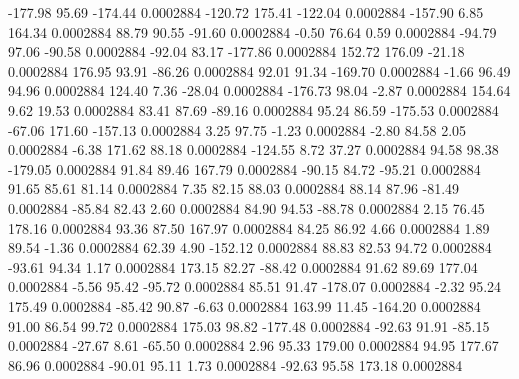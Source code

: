      -177.98       95.69     -174.44     0.0002884
     -120.72      175.41     -122.04     0.0002884
     -157.90        6.85      164.34     0.0002884
       88.79       90.55      -91.60     0.0002884
       -0.50       76.64        0.59     0.0002884
      -94.79       97.06      -90.58     0.0002884
      -92.04       83.17     -177.86     0.0002884
      152.72      176.09      -21.18     0.0002884
      176.95       93.91      -86.26     0.0002884
       92.01       91.34     -169.70     0.0002884
       -1.66       96.49       94.96     0.0002884
      124.40        7.36      -28.04     0.0002884
     -176.73       98.04       -2.87     0.0002884
      154.64        9.62       19.53     0.0002884
       83.41       87.69      -89.16     0.0002884
       95.24       86.59     -175.53     0.0002884
      -67.06      171.60     -157.13     0.0002884
        3.25       97.75       -1.23     0.0002884
       -2.80       84.58        2.05     0.0002884
       -6.38      171.62       88.18     0.0002884
     -124.55        8.72       37.27     0.0002884
       94.58       98.38     -179.05     0.0002884
       91.84       89.46      167.79     0.0002884
      -90.15       84.72      -95.21     0.0002884
       91.65       85.61       81.14     0.0002884
        7.35       82.15       88.03     0.0002884
       88.14       87.96      -81.49     0.0002884
      -85.84       82.43        2.60     0.0002884
       84.90       94.53      -88.78     0.0002884
        2.15       76.45      178.16     0.0002884
       93.36       87.50      167.97     0.0002884
       84.25       86.92        4.66     0.0002884
        1.89       89.54       -1.36     0.0002884
       62.39        4.90     -152.12     0.0002884
       88.83       82.53       94.72     0.0002884
      -93.61       94.34        1.17     0.0002884
      173.15       82.27      -88.42     0.0002884
       91.62       89.69      177.04     0.0002884
       -5.56       95.42      -95.72     0.0002884
       85.51       91.47     -178.07     0.0002884
       -2.32       95.24      175.49     0.0002884
      -85.42       90.87       -6.63     0.0002884
      163.99       11.45     -164.20     0.0002884
       91.00       86.54       99.72     0.0002884
      175.03       98.82     -177.48     0.0002884
      -92.63       91.91      -85.15     0.0002884
      -27.67        8.61      -65.50     0.0002884
        2.96       95.33      179.00     0.0002884
       94.95      177.67       86.96     0.0002884
      -90.01       95.11        1.73     0.0002884
      -92.63       95.58      173.18     0.0002884
